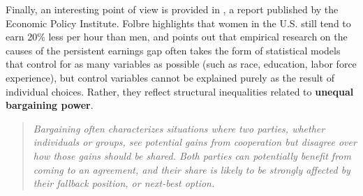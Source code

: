 Finally, an interesting point of view is provided in \cite{folbre2021gender}, a report published by the Economic Policy Institute. Folbre highlights that women in the U.S. still tend to earn 20\% less per hour than men, and points out that empirical research on the causes of the persistent earnings gap often takes the form of statistical models that control for as many variables as possible (such as race, education, labor force experience), but control variables cannot be explained purely as the result of individual choices. Rather, they reflect structural inequalities related to \textbf{unequal bargaining power}.
\begin{quote}\emph{Bargaining often characterizes situations where two parties, whether individuals or groups, see potential gains from cooperation but disagree over how those gains should be shared. Both parties can potentially benefit from coming to an agreement, and their share is likely to be strongly affected by their fallback position, or next-best option.} \cite[p.~9]{folbre2021gender}\end{quote}

